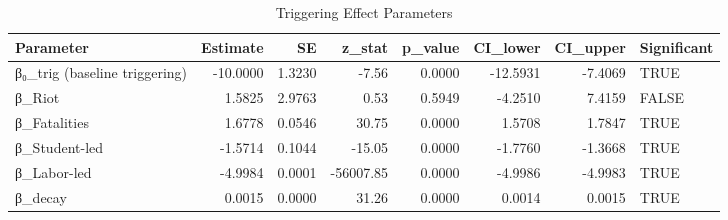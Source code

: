 \begin{table}[ht]
\centering
\begin{tabular}{lrrrrrrl}
  \hline
Parameter & Estimate & SE & z\_stat & p\_value & CI\_lower & CI\_upper & Significant \\ 
  \hline
β₀\_trig (baseline triggering) & -10.0000 & 1.3230 & -7.56 & 0.0000 & -12.5931 & -7.4069 & TRUE \\ 
  β\_Riot & 1.5825 & 2.9763 & 0.53 & 0.5949 & -4.2510 & 7.4159 & FALSE \\ 
  β\_Fatalities & 1.6778 & 0.0546 & 30.75 & 0.0000 & 1.5708 & 1.7847 & TRUE \\ 
  β\_Student-led & -1.5714 & 0.1044 & -15.05 & 0.0000 & -1.7760 & -1.3668 & TRUE \\ 
  β\_Labor-led & -4.9984 & 0.0001 & -56007.85 & 0.0000 & -4.9986 & -4.9983 & TRUE \\ 
  β\_decay & 0.0015 & 0.0000 & 31.26 & 0.0000 & 0.0014 & 0.0015 & TRUE \\ 
   \hline
\end{tabular}
\caption{Triggering Effect Parameters} 
\label{tab:triggering}
\end{table}
